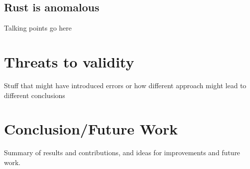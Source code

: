 \documentclass[conference]{IEEEtran}
\begin{document}
\subsection{Rust is anomalous}
Talking points go here



\section{Threats to validity}
Stuff that might have introduced errors or how different approach might lead to different conclusions

\section{Conclusion/Future Work}
Summary of results and contributions, and ideas for improvements and future work.\\
\end{document}

